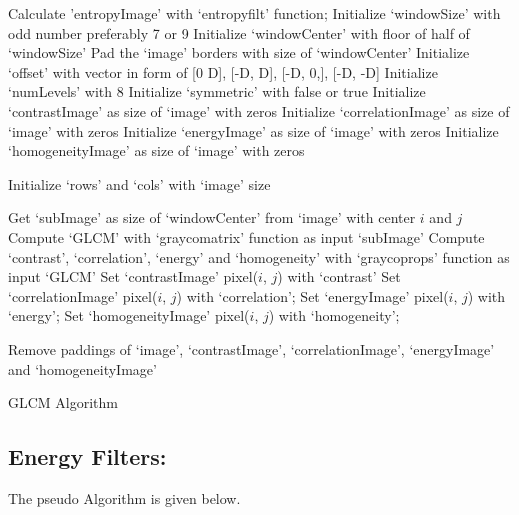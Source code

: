 \documentclass{article}
\begin{document}
\begin{algorithm}[H]
 Calculate 'entropyImage' with ‘entropyfilt’ function;
 Initialize ‘windowSize’ with odd number preferably 7 or 9\;
 Initialize ‘windowCenter’ with floor of half of ‘windowSize’\;
 Pad the ‘image’ borders with size of ‘windowCenter’\;
 Initialize ‘offset’ with vector in form of  [0 D], [-D, D], [-D, 0,], [-D, -D]\; 
 Initialize ‘numLevels’ with 8\;
 Initialize ‘symmetric’ with false or true\;
 Initialize ‘contrastImage’ as size of ‘image’ with zeros\; 
 Initialize ‘correlationImage’ as size of ‘image’ with zeros\; 
 Initialize ‘energyImage’ as size of ‘image’ with zeros\; 
 Initialize ‘homogeneityImage’ as size of ‘image’ with zeros\; 
 
 Initialize ‘rows’ and ‘cols’ with ‘image’ size\;
 
 {
 	 {
 	 	Get ‘subImage’ as size of ‘windowCenter’ from ‘image’ with center $i$ and $j$\;
 	 	Compute ‘GLCM’ with ‘graycomatrix’ function as input ‘subImage’\;
 	 	Compute ‘contrast’, ‘correlation’, ‘energy’ and ‘homogeneity’ with ‘graycoprops’ function as input ‘GLCM’
 	 	Set ‘contrastImage’ pixel($i$, $j$) with ‘contrast’\;
 	 	Set ‘correlationImage’ pixel($i$, $j$) with ‘correlation’;
 	 	Set ‘energyImage’ pixel($i$, $j$) with ‘energy’;
 	 	Set ‘homogeneityImage’ pixel($i$, $j$) with ‘homogeneity’;
 	 }
 }
 
 Remove paddings of ‘image’, ‘contrastImage’, ‘correlationImage’, ‘energyImage’ and ‘homogeneityImage’\;
 
 \caption{GLCM Algorithm}
\end{algorithm}  
  
\subsection{Energy Filters:}
The pseudo Algorithm is given below.
\end{document}
